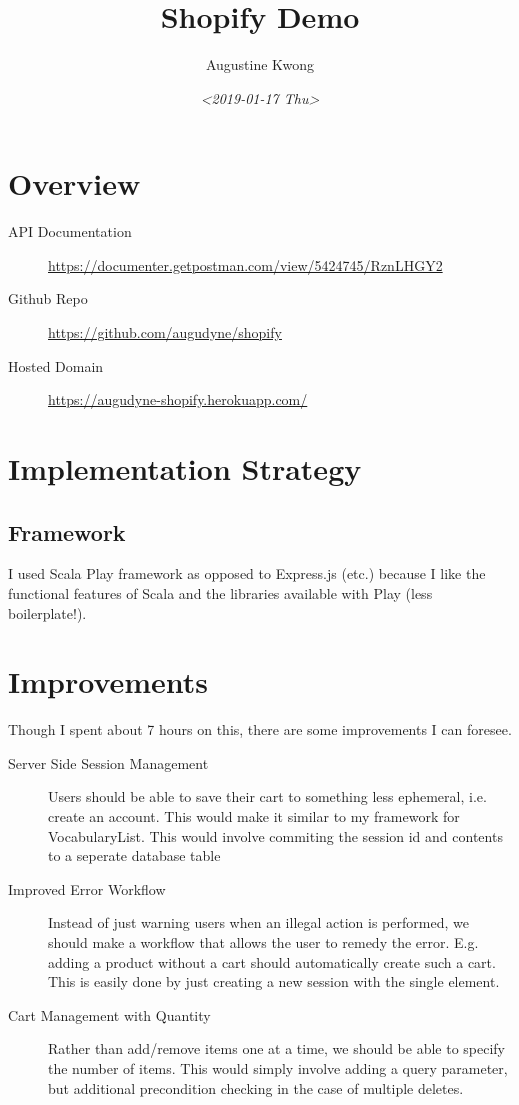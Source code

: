 \documentclass[11pt]{article}
\author{Augustine Kwong}
\date{\textit{<2019-01-17 Thu>}}
\title{Shopify Demo}
\begin{document}
\maketitle
\tableofcontents


\section{Overview}
\label{sec:org258fbed}
\begin{description}
\item[{API Documentation}] \url{https://documenter.getpostman.com/view/5424745/RznLHGY2}
\item[{Github Repo}] \url{https://github.com/augudyne/shopify}
\item[{Hosted Domain}] \url{https://augudyne-shopify.herokuapp.com/}
\end{description}
\section{Implementation Strategy}
\label{sec:org20855e9}
\subsection{Framework}
\label{sec:orgdd53a9c}
I used Scala Play framework as opposed to Express.js (etc.) because I like the functional features of Scala and the libraries available with Play (less boilerplate!). 
\section{Improvements}
\label{sec:orgf727fe5}
Though I spent about 7 hours on this, there are some improvements I can foresee.
\begin{description}
\item[{Server Side Session Management}] Users should be able to save their cart to something less ephemeral, i.e. create an account. This would make it similar to my framework for VocabularyList. This would involve commiting the session id and contents to a seperate database table
\item[{Improved Error Workflow}] Instead of just warning users when an illegal action is performed, we should make a workflow that allows the user to remedy the error. E.g. adding a product without a cart should automatically create such a cart. This is easily done by just creating a new session with the single element.
\item[{Cart Management with Quantity}] Rather than add/remove items one at a time, we should be able to specify the number of items. This would simply involve adding a query parameter, but additional precondition checking in the case of multiple deletes.
\end{description}
\end{document}
